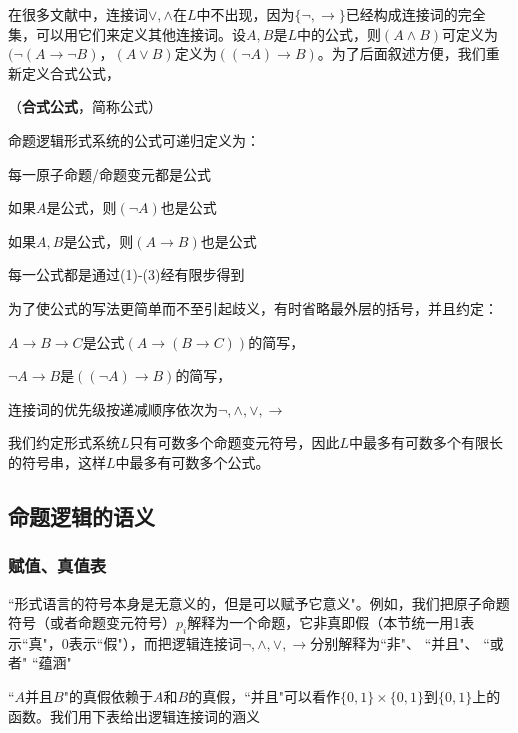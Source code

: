 在很多文献中，连接词$\lor, \land$在$L$中不出现，因为$\{\neg, \to \}$已经构成连接词的完全集，可以用它们来定义其他连接词。设$A, B$是$L$中的公式，则$(A \land B)$可定义为$(\neg (A \to \neg B)$，$(A \lor B)$定义为$((\neg A) \to B)$。为了后面叙述方便，我们重新定义合式公式，

\begin{defn} （\textbf{合式公式}，简称公式）

命题逻辑形式系统的公式可递归定义为：
\begin{tightenum}
 \item 每一原子命题/命题变元都是公式
 \item 如果$A$是公式，则$(\neg A)$也是公式
 \item 如果$A, B$是公式，则$(A \to B)$也是公式
\item 每一公式都是通过(1)-(3)经有限步得到
\end{tightenum}
\end{defn}


为了使公式的写法更简单而不至引起歧义，有时省略最外层的括号，并且约定：
\begin{tightenum}
  \item $A \to B \to C$是公式$(A \to (B \to C))$的简写，
  \item $\neg A \to B$是$((\neg A) \to B)$的简写，
  \item 连接词的优先级按递减顺序依次为$\neg, \land, \lor, \to$
\end{tightenum}


我们约定形式系统$L$只有可数多个命题变元符号，因此$L$中最多有可数多个有限长的符号串，这样$L$中最多有可数多个公式。





\subsection{命题逻辑的语义}



\subsubsection{赋值、真值表}

``形式语言的符号本身是无意义的，但是可以赋予它意义"。例如，我们把原子命题符号（或者命题变元符号）$p_i$解释为一个命题，它非真即假（本节统一用1表示``真"，0表示``假"），而把逻辑连接词$\neg, \land, \lor, \to$分别解释为``非"、 ``并且"、 ``或者" ``蕴涵"

``$A$并且$B$"的真假依赖于$A$和$B$的真假，``并且"可以看作$\{ 0, 1\} \times \{ 0, 1\}$到$\{0, 1\}$上的函数。我们用下表给出逻辑连接词的涵义



